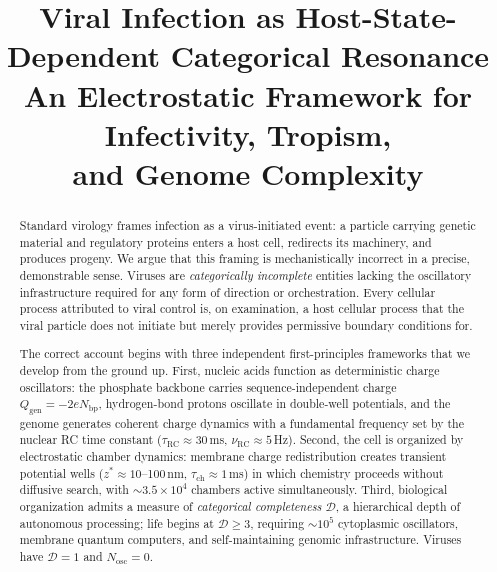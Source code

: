 \documentclass[12pt,a4paper]{article}
\title{%
  \textbf{Viral Infection as Host-State-Dependent Categorical Resonance}\\[8pt]
  \large An Electrostatic Framework for Infectivity, Tropism,\\[4pt]
  and Genome Complexity
}
\author{}
\date{}
\theoremstyle{definition}
\theoremstyle{remark}
\newcommand{\tauRC}{\tau_{\mathrm{RC}}}
\newcommand{\nuRC}{\nu_{\mathrm{RC}}}
\newcommand{\Qgen}{Q_{\mathrm{gen}}}
\newcommand{\Nosc}{N_{\mathrm{osc}}}
\newcommand{\taucham}{\tau_{\mathrm{ch}}}
\newcommand{\zstar}{z^{*}}
\begin{document}

\maketitle
\thispagestyle{empty}

\begin{abstract}
Standard virology frames infection as a virus-initiated event: a particle carrying genetic material and regulatory proteins enters a host cell, redirects its machinery, and produces progeny. We argue that this framing is mechanistically incorrect in a precise, demonstrable sense. Viruses are \emph{categorically incomplete} entities lacking the oscillatory infrastructure required for any form of direction or orchestration. Every cellular process attributed to viral control is, on examination, a host cellular process that the viral particle does not initiate but merely provides permissive boundary conditions for.

The correct account begins with three independent first-principles frameworks that we develop from the ground up. First, nucleic acids function as deterministic charge oscillators: the phosphate backbone carries sequence-independent charge $\Qgen = -2e N_{\mathrm{bp}}$, hydrogen-bond protons oscillate in double-well potentials, and the genome generates coherent charge dynamics with a fundamental frequency set by the nuclear RC time constant ($\tauRC \approx 30$\,ms, $\nuRC \approx 5$\,Hz). Second, the cell is organized by electrostatic chamber dynamics: membrane charge redistribution creates transient potential wells ($\zstar \approx 10$--100\,nm, $\taucham \approx 1$\,ms) in which chemistry proceeds without diffusive search, with $\sim\!3.5\times10^{4}$ chambers active simultaneously. Third, biological organization admits a measure of \emph{categorical completeness} $\mathcal{D}$, a hierarchical depth of autonomous processing; life begins at $\mathcal{D}\geq 3$, requiring $\sim\!10^5$ cytoplasmic oscillators, membrane quantum computers, and self-maintaining genomic infrastructure. Viruses have $\mathcal{D}=1$ and $\Nosc = 0$.


\end{abstract}
\end{document}
